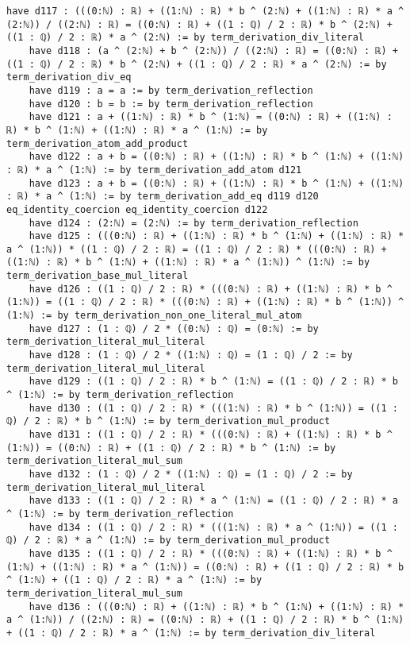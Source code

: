 \documentclass{article}
\begin{document}
\begin{tcolorbox}[colback=white!10, width=\linewidth]
\begin{lstlisting}[language=Lean4]
    have d117 : (((0:ℕ) : ℝ) + ((1:ℕ) : ℝ) * b ^ (2:ℕ) + ((1:ℕ) : ℝ) * a ^ (2:ℕ)) / ((2:ℕ) : ℝ) = ((0:ℕ) : ℝ) + ((1 : ℚ) / 2 : ℝ) * b ^ (2:ℕ) + ((1 : ℚ) / 2 : ℝ) * a ^ (2:ℕ) := by term_derivation_div_literal
    have d118 : (a ^ (2:ℕ) + b ^ (2:ℕ)) / ((2:ℕ) : ℝ) = ((0:ℕ) : ℝ) + ((1 : ℚ) / 2 : ℝ) * b ^ (2:ℕ) + ((1 : ℚ) / 2 : ℝ) * a ^ (2:ℕ) := by term_derivation_div_eq
    have d119 : a = a := by term_derivation_reflection
    have d120 : b = b := by term_derivation_reflection
    have d121 : a + ((1:ℕ) : ℝ) * b ^ (1:ℕ) = ((0:ℕ) : ℝ) + ((1:ℕ) : ℝ) * b ^ (1:ℕ) + ((1:ℕ) : ℝ) * a ^ (1:ℕ) := by term_derivation_atom_add_product
    have d122 : a + b = ((0:ℕ) : ℝ) + ((1:ℕ) : ℝ) * b ^ (1:ℕ) + ((1:ℕ) : ℝ) * a ^ (1:ℕ) := by term_derivation_add_atom d121
    have d123 : a + b = ((0:ℕ) : ℝ) + ((1:ℕ) : ℝ) * b ^ (1:ℕ) + ((1:ℕ) : ℝ) * a ^ (1:ℕ) := by term_derivation_add_eq d119 d120 eq_identity_coercion eq_identity_coercion d122
    have d124 : (2:ℕ) = (2:ℕ) := by term_derivation_reflection
    have d125 : (((0:ℕ) : ℝ) + ((1:ℕ) : ℝ) * b ^ (1:ℕ) + ((1:ℕ) : ℝ) * a ^ (1:ℕ)) * ((1 : ℚ) / 2 : ℝ) = ((1 : ℚ) / 2 : ℝ) * (((0:ℕ) : ℝ) + ((1:ℕ) : ℝ) * b ^ (1:ℕ) + ((1:ℕ) : ℝ) * a ^ (1:ℕ)) ^ (1:ℕ) := by term_derivation_base_mul_literal
    have d126 : ((1 : ℚ) / 2 : ℝ) * (((0:ℕ) : ℝ) + ((1:ℕ) : ℝ) * b ^ (1:ℕ)) = ((1 : ℚ) / 2 : ℝ) * (((0:ℕ) : ℝ) + ((1:ℕ) : ℝ) * b ^ (1:ℕ)) ^ (1:ℕ) := by term_derivation_non_one_literal_mul_atom
    have d127 : (1 : ℚ) / 2 * ((0:ℕ) : ℚ) = (0:ℕ) := by term_derivation_literal_mul_literal
    have d128 : (1 : ℚ) / 2 * ((1:ℕ) : ℚ) = (1 : ℚ) / 2 := by term_derivation_literal_mul_literal
    have d129 : ((1 : ℚ) / 2 : ℝ) * b ^ (1:ℕ) = ((1 : ℚ) / 2 : ℝ) * b ^ (1:ℕ) := by term_derivation_reflection
    have d130 : ((1 : ℚ) / 2 : ℝ) * (((1:ℕ) : ℝ) * b ^ (1:ℕ)) = ((1 : ℚ) / 2 : ℝ) * b ^ (1:ℕ) := by term_derivation_mul_product
    have d131 : ((1 : ℚ) / 2 : ℝ) * (((0:ℕ) : ℝ) + ((1:ℕ) : ℝ) * b ^ (1:ℕ)) = ((0:ℕ) : ℝ) + ((1 : ℚ) / 2 : ℝ) * b ^ (1:ℕ) := by term_derivation_literal_mul_sum
    have d132 : (1 : ℚ) / 2 * ((1:ℕ) : ℚ) = (1 : ℚ) / 2 := by term_derivation_literal_mul_literal
    have d133 : ((1 : ℚ) / 2 : ℝ) * a ^ (1:ℕ) = ((1 : ℚ) / 2 : ℝ) * a ^ (1:ℕ) := by term_derivation_reflection
    have d134 : ((1 : ℚ) / 2 : ℝ) * (((1:ℕ) : ℝ) * a ^ (1:ℕ)) = ((1 : ℚ) / 2 : ℝ) * a ^ (1:ℕ) := by term_derivation_mul_product
    have d135 : ((1 : ℚ) / 2 : ℝ) * (((0:ℕ) : ℝ) + ((1:ℕ) : ℝ) * b ^ (1:ℕ) + ((1:ℕ) : ℝ) * a ^ (1:ℕ)) = ((0:ℕ) : ℝ) + ((1 : ℚ) / 2 : ℝ) * b ^ (1:ℕ) + ((1 : ℚ) / 2 : ℝ) * a ^ (1:ℕ) := by term_derivation_literal_mul_sum
    have d136 : (((0:ℕ) : ℝ) + ((1:ℕ) : ℝ) * b ^ (1:ℕ) + ((1:ℕ) : ℝ) * a ^ (1:ℕ)) / ((2:ℕ) : ℝ) = ((0:ℕ) : ℝ) + ((1 : ℚ) / 2 : ℝ) * b ^ (1:ℕ) + ((1 : ℚ) / 2 : ℝ) * a ^ (1:ℕ) := by term_derivation_div_literal

\end{lstlisting}
\end{tcolorbox}
\end{document}
